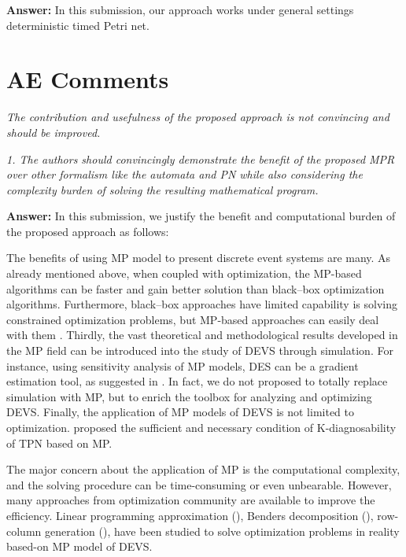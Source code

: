 \documentclass[suppldata]{interact}
\begin{document}
\noindent
\textbf{Answer:} In this submission, our approach works under general settings deterministic timed Petri net. 


\section{AE Comments}
\textit{The contribution and usefulness of the proposed approach is not convincing and should be improved. }

\textit{1. The authors should convincingly demonstrate the benefit of the proposed MPR over other formalism like the automata and PN while also considering the complexity burden of solving the resulting mathematical program. }

\noindent
\textbf{Answer:} In this submission, we justify the benefit and computational burden of the proposed approach as follows: 

The benefits of using MP model to present discrete event systems are many. As already mentioned above, when coupled with optimization, the MP-based algorithms can be faster and gain better solution than black--box optimization algorithms. Furthermore, black--box approaches have limited capability is solving constrained optimization problems, but MP-based approaches can easily deal with them \cite{zhang2020models}. Thirdly, the vast theoretical and methodological results developed in the MP field can be introduced into the study of DEVS through simulation. For instance, using sensitivity analysis of MP models, DES can be a gradient estimation tool, as suggested in \cite{chan2008optimization}. In fact, we do not proposed to totally replace simulation with MP, but to enrich the toolbox for analyzing and optimizing DEVS. Finally, the application of MP models of DEVS is not limited to optimization. \cite{basile2012k} proposed the sufficient and necessary condition of K-diagnosability of TPN based on MP. 


The major concern about the application of MP is the computational complexity, and the solving procedure can be time-consuming or even unbearable. However, many approaches from optimization community are available to improve the efficiency. Linear programming approximation (\cite{alfieri2012mathematical}), Benders decomposition (\cite{weiss2015buffer}), row-column generation (\cite{alfieri2020time}), have been studied to solve optimization problems in reality based-on MP model of DEVS.

~\\
\end{document}

